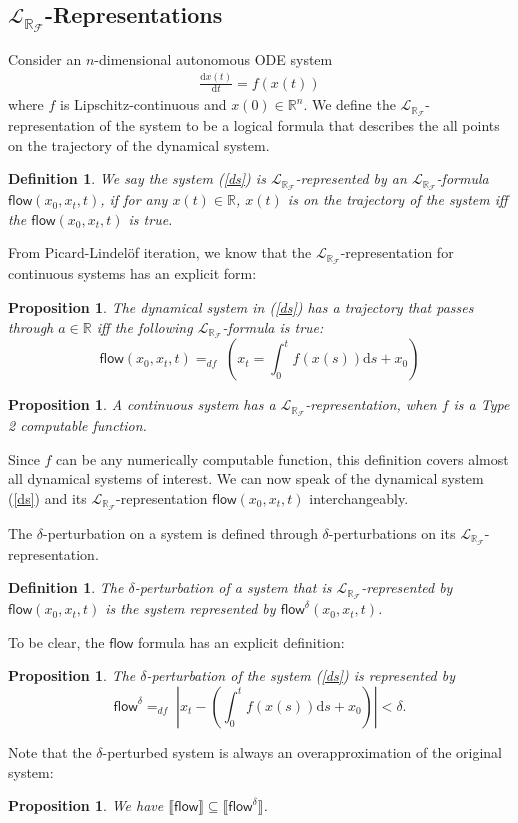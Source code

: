 \documentclass[12pt]{article}
\theoremstyle{plain}
\newtheorem{proposition}[theorem]{Proposition}
\newtheorem{definition}[theorem]{Definition}
\theoremstyle{definition}
\newcommand{\flow}{\mathsf{flow}}
\newcommand{\lrf}{\mathcal{L}_{\mathbb{R}_{\mathcal{F}}}}
\newcommand{\der}{\mathrm{d}}
\begin{document}
\subsection{$\lrf$-Representations}

Consider an $n$-dimensional autonomous ODE system
\begin{eqnarray}\label{ds}
\frac{\der x(t)}{\der t} = f(x(t))
\end{eqnarray}
where $f$ is Lipschitz-continuous and $x(0)\in \mathbb{R}^n$. We define the $\lrf$-representation of the system to be a logical formula that describes the all points on the trajectory of the dynamical system.
\begin{definition}
We say the system (\ref{ds}) is $\lrf$-represented by an $\lrf$-formula $\flow(x_0, x_t, t)$, if for any $x(t)\in \mathbb{R}$, $x(t)$ is on the trajectory of the system iff the $\flow(x_0, x_t, t)$ is true.
\end{definition}

From Picard-Lindel\"of iteration, we know that the $\lrf$-representation for continuous systems has an explicit form:

\begin{proposition}
The dynamical system in (\ref{ds}) has a trajectory that passes through $a\in \mathbb{R}$ iff the following $\lrf$-formula is true:
$$\flow(x_0, x_t, t)=_{df}\; (x_t = \int_0^t f(x(s))\der s + x_0)$$
\end{proposition}

\begin{proposition}
A continuous system has a $\lrf$-representation, when $f$ is a Type 2 computable function.
\end{proposition}

Since $f$ can be any numerically computable function, this definition covers almost all dynamical systems of interest. We can now speak of the dynamical system (\ref{ds}) and its $\lrf$-representation $\flow(x_0, x_t, t)$ interchangeably.

The $\delta$-perturbation on a system is defined through $\delta$-perturbations on its $\lrf$-representation.
\begin{definition}
The $\delta$-perturbation of a system that is $\lrf$-represented by $\flow(x_0, x_t, t)$ is the system represented by $\flow^{\delta}(x_0, x_t, t)$.
\end{definition}
To be clear, the $\flow$ formula has an explicit definition:
\begin{proposition}
The $\delta$-perturbation of the system (\ref{ds}) is represented by
$$\flow^{\delta} =_{df}\; |x_t- (\int_0^t f(x(s))\der s + x_0)|<\delta.$$
\end{proposition}
Note that the $\delta$-perturbed system is always an overapproximation of the original system:
\begin{proposition}
We have $\llbracket\flow\rrbracket\subseteq \llbracket \flow^{\delta}\rrbracket$.
\end{proposition}
\end{document}
